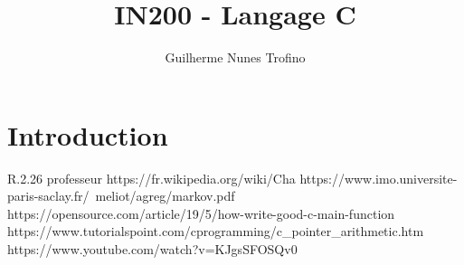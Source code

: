 \documentclass{article}
\title{IN200 - Langage C}
\author{Guilherme Nunes Trofino}
\begin{document}
\maketitle

\newpage\tableofcontents

\section{Introduction}
R.2.26 professeur
https://fr.wikipedia.org/wiki/Cha%
https://www.imo.universite-paris-saclay.fr/~meliot/agreg/markov.pdf
https://opensource.com/article/19/5/how-write-good-c-main-function
https://www.tutorialspoint.com/cprogramming/c_pointer_arithmetic.htm
https://www.youtube.com/watch?v=KJgsSFOSQv0
\end{document}
